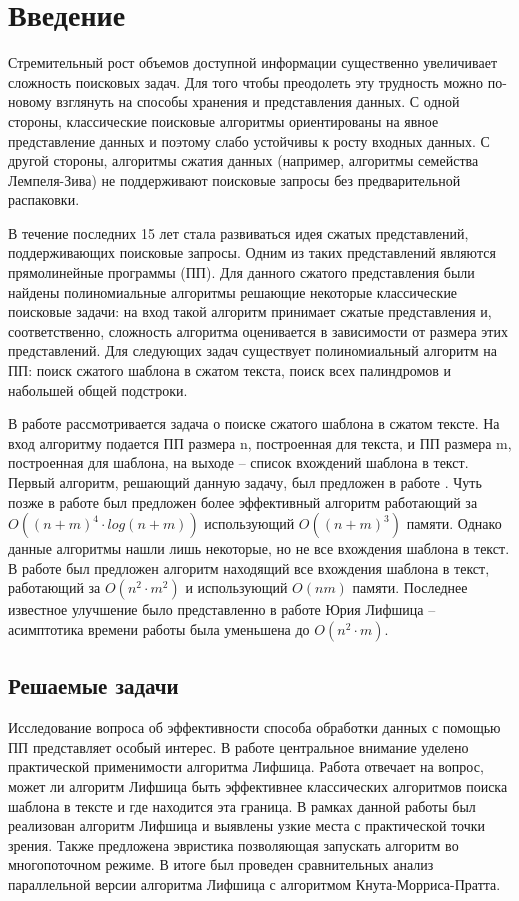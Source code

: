 \documentclass[14pt]{article}
\begin{document}
\tableofcontents
\newpage

\section{Введение}Стремительный рост объемов доступной информации существенно увеличивает сложность поисковых задач. Для того чтобы преодолеть эту трудность можно по-новому взглянуть на способы хранения и представления данных. С одной стороны, классические поисковые алгоритмы ориентированы на явное представление данных и поэтому слабо устойчивы к росту входных данных. С другой стороны, алгоритмы сжатия данных (например, алгоритмы семейства Лемпеля-Зива) не поддерживают поисковые запросы без предварительной распаковки. 

В течение последних 15 лет стала развиваться идея сжатых представлений, поддерживающих поисковые запросы. Одним из таких представлений являются прямолинейные программы (ПП). Для данного сжатого представления были найдены полиномиальные алгоритмы решающие некоторые классические поисковые задачи: на вход такой алгоритм принимает сжатые представления и, соответственно, сложность алгоритма оценивается в зависимости от размера этих представлений. Для следующих задач существует полиномиальный алгоритм на ПП: поиск сжатого шаблона в сжатом текста\cite{Karpinski}, поиск всех палиндромов и набольшей общей подстроки\cite{PalindromeAlgo}. 

В работе рассмотривается задача о поиске сжатого шаблона в сжатом тексте. На вход алгоритму подается ПП размера n, построенная для текста, и ПП размера m, построенная для шаблона, на выходе -- список вхождений шаблона в текст. Первый алгоритм, решающий данную задачу, был предложен в работе \cite{Karpinski}. Чуть позже в работе \cite{Karpinski2} был предложен более эффективный алгоритм  работающий за $O((n + m)^4 \cdot log (n + m))$ использующий $O((n + m)^3)$ памяти. Однако данные алгоритмы нашли лишь некоторые, но не все вхождения шаблона в текст. В работе \cite{Shinohara} был предложен алгоритм находящий все вхождения шаблона в текст, работающий за $O(n^2 \cdot m^2)$ и использующий $O(nm)$ памяти. Последнее известное улучшение было представленно в работе \cite{Lifshits} Юрия Лифшица -- асимптотика времени работы была уменьшена до $O(n^2 \cdot m)$. 
\subsection{Решаемые задачи}
Исследование вопроса об эффективности способа обработки данных с помощью ПП представляет особый интерес. 
В работе центральное внимание уделено практической применимости алгоритма Лифшица. Работа отвечает на вопрос, может ли алгоритм Лифшица быть эффективнее классических алгоритмов поиска шаблона в тексте и где находится эта граница.
В рамках данной работы был реализован алгоритм Лифшица и выявлены узкие места с практической точки зрения. Также предложена эвристика позволяющая запускать алгоритм во многопоточном режиме. В итоге был проведен сравнительных анализ параллельной версии алгоритма Лифшица с алгоритмом Кнута-Морриса-Пратта.
\end{document}
